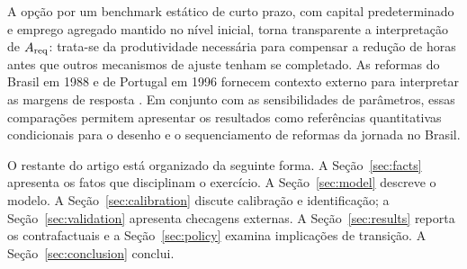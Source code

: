 A op\c{c}\~ao por um benchmark est\'atico de curto prazo, com capital
predeterminado e emprego agregado mantido no n\'ivel inicial, torna transparente
a interpreta\c{c}\~ao de $A_{\mathrm{req}}$: trata-se da produtividade necess\'aria para
compensar a redu\c{c}\~ao de horas antes que outros mecanismos de ajuste tenham
se completado. As reformas do Brasil em 1988 e de Portugal em 1996 fornecem
contexto externo para interpretar as margens de resposta
\citep{GonzagaMenezesFilhoCamargo2003,AsaiLopesTondini2024}. Em conjunto com
as sensibilidades de par\^ametros, essas compara\c{c}\~oes permitem apresentar os
resultados como refer\^encias quantitativas condicionais para o desenho e o
sequenciamento de reformas da jornada no Brasil.

O restante do artigo est\'a organizado da seguinte forma. A Se\c{c}\~ao~\ref{sec:facts} apresenta os fatos que disciplinam o exerc\'icio. A Se\c{c}\~ao~\ref{sec:model} descreve o modelo. A Se\c{c}\~ao~\ref{sec:calibration} discute calibra\c{c}\~ao e identifica\c{c}\~ao; a Se\c{c}\~ao~\ref{sec:validation} apresenta checagens externas. A Se\c{c}\~ao~\ref{sec:results} reporta os contrafactuais e a Se\c{c}\~ao~\ref{sec:policy} examina implica\c{c}\~oes de transi\c{c}\~ao. A Se\c{c}\~ao~\ref{sec:conclusion} conclui.

